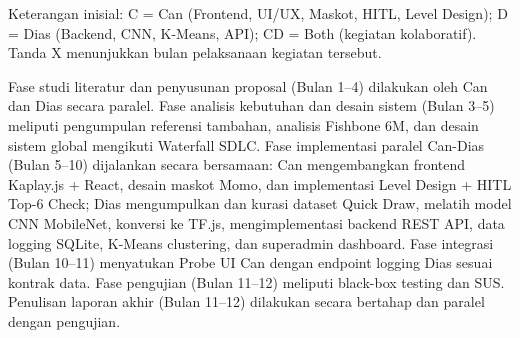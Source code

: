 \documentclass[12pt,a4paper,oneside,openany]{report}
\begin{document}
Keterangan inisial: C = Can (Frontend, UI/UX, Maskot, HITL, Level Design); D = Dias (Backend, CNN, K-Means, API); CD = Both (kegiatan kolaboratif). Tanda X menunjukkan bulan pelaksanaan kegiatan tersebut.

Fase studi literatur dan penyusunan proposal (Bulan 1--4) dilakukan oleh Can dan Dias secara paralel. Fase analisis kebutuhan dan desain sistem (Bulan 3--5) meliputi pengumpulan referensi tambahan, analisis Fishbone 6M, dan desain sistem global mengikuti Waterfall SDLC. Fase implementasi paralel Can-Dias (Bulan 5--10) dijalankan secara bersamaan: Can mengembangkan frontend Kaplay.js + React, desain maskot Momo, dan implementasi Level Design + HITL Top-6 Check; Dias mengumpulkan dan kurasi dataset Quick Draw, melatih model CNN MobileNet, konversi ke TF.js, mengimplementasi backend REST API, data logging SQLite, K-Means clustering, dan superadmin dashboard. Fase integrasi (Bulan 10--11) menyatukan Probe UI Can dengan endpoint logging Dias sesuai kontrak data. Fase pengujian (Bulan 11--12) meliputi black-box testing dan SUS. Penulisan laporan akhir (Bulan 11--12) dilakukan secara bertahap dan paralel dengan pengujian.
\end{document}
